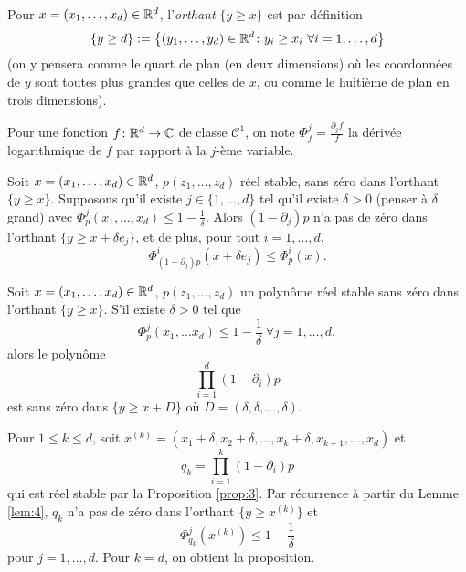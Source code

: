 Pour $x = (x_1, \ldots, x_d) \in \mathbb{R}^d$, l'\emph{orthant} $\{y \geq x\}$ est par définition 
\[ \{y \geq d\} := \left\{ (y_1, \ldots, y_d) \in \mathbb{R}^d \colon y_i \geq x_i \ \forall i = 1, \ldots,
    d\right\} \]
(on y pensera comme le quart de plan (en deux dimensions) où les coordonnées de $y$ sont toutes plus grandes
que celles de $x$, ou comme le huitième de plan en trois dimensions).

Pour une fonction $f \colon \mathbb{R}^d \to \mathbb{C}$ de classe $\mathcal{C}^1$, on note $\Phi_f^j = \frac{\partial_j
  f}{f}$ la dérivée logarithmique de $f$ par rapport à la $j$-ème variable.

\begin{lem}
  \label{lem:4}
  Soit $x = (x_1, \ldots, x_d) \in \mathbb{R}^d$, $p(z_1, \ldots, z_d)$ réel stable, sans zéro dans l'orthant
  $\{y \geq x\}$. Supposons qu'il existe $j \in \{1, \ldots, d\}$ tel qu'il existe $\delta > 0$ (penser à
  $\delta$ grand) avec $\Phi_p^j(x_1, \ldots, x_d) \leq 1 - \frac{1}{\delta}$. Alors $(1 - \partial_j)p$ n'a
  pas de zéro dans l'orthant $\{y \geq x + \delta e_j\}$, et de plus, pour tout $i = 1, \ldots, d$,
  \begin{equation}
    \label{eq:lemme-degue}
    \Phi_{(1-\partial_j)p}^i(x + \delta e_j)  \leq \Phi_p^i(x).
  \end{equation}
\end{lem}

\begin{prop}
  \label{prop:5}
  Soit $x = (x_1, \ldots, x_d) \in \mathbb{R}^d$, $p(z_1, \ldots, z_d)$ un polynôme réel stable sans zéro dans
  l'orthant $\{y \geq x\}$. S'il existe $\delta > 0$ tel que 
  \[ \Phi_p^j (x_1, \ldots x_d) \leq 1 - \frac{1}{\delta}\ \forall j = 1, \ldots, d, \]
  alors le polynôme 
  \[ \prod_{i=1}^d (1 - \partial_i)p \]
  est sans zéro dans $\{y \geq x + D\}$ où $D = (\delta, \delta, \ldots, \delta)$.
\end{prop}

\begin{preuve}
  Pour $1 \leq k \leq d$, soit $x^{(k)} = (x_1 + \delta, x_2 + \delta, \ldots, x_k + \delta, x_{k+1}, \ldots,
  x_d)$ et 
  \[ q_k = \prod_{i=1}^k \left(1 - \partial_i\right)p \]
  qui est réel stable par la Proposition \ref{prop:3}. Par récurrence à partir du Lemme \ref{lem:4}, $q_k$ n'a
  pas de zéro dans l'orthant $\{y \geq x^{(k)}\}$ et 
  \[ \Phi_{q_k}^j (x^{(k)}) \leq 1 - \frac{1}{\delta} \]
  pour $j = 1, \ldots, d$. Pour $k = d$, on obtient la proposition.
\end{preuve}



